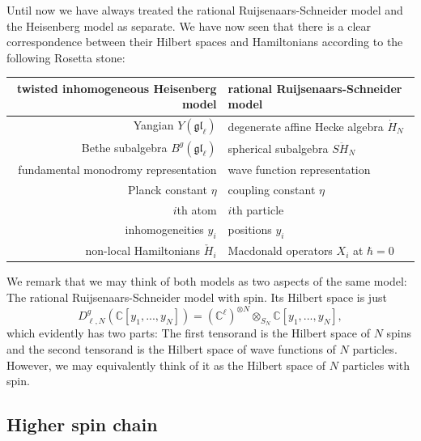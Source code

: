 \documentclass[11pt]{report}
\theoremstyle{definition}
\theoremstyle{remark}
\theoremstyle{remark}
\newcommand{\C}{\mathbb{C}}
\begin{document}
Until now we have always treated the rational Ruijsenaars-Schneider model and the Heisenberg model as separate. We have now seen that there is a clear correspondence between their Hilbert spaces and Hamiltonians according to the following Rosetta stone:
\begin{center}
\begin{tabular}{|r||l|}
\hline
twisted inhomogeneous Heisenberg model & rational Ruijsenaars-Schneider model \\
\hline
Yangian $Y(\mathfrak{gl}_\ell)$ & degenerate affine Hecke algebra $\dot H_N$ \\
Bethe subalgebra $B^g(\mathfrak{gl}_\ell)$ & spherical subalgebra $S\ddot H_N$ \\
fundamental monodromy representation & wave function representation \\
Planck constant $\eta$ & coupling constant $\eta$ \\
$i$th atom & $i$th particle \\
inhomogeneities $y_i$ & positions $y_i$ \\
non-local Hamiltonians $\check H_i$ & Macdonald operators $X_i$ at $\hbar = 0$ \\
\hline
\end{tabular}
\end{center}
We remark that we may think of both models as two aspects of the same model: The rational Ruijsenaars-Schneider model with spin. Its Hilbert space is just
\begin{equation*}
D_{\ell,N}^g(\C[y_1,...,y_N]) = (\C^\ell)^{\otimes N} \otimes_{S_N} \C[y_1,...,y_N],
\end{equation*}
which evidently has two parts: The first tensorand is the Hilbert space of $N$ spins and the second tensorand is the Hilbert space of wave functions of $N$ particles. However, we may equivalently think of it as the Hilbert space of $N$ particles with spin.

\subsection{Higher spin chain}
\end{document}

